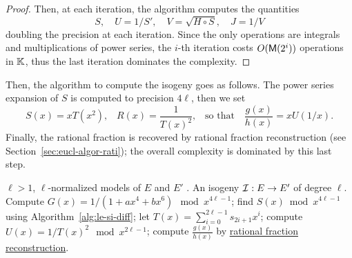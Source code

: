 \begin{proof}
  Then, at each iteration, the algorithm computes the quantities
  \begin{equation}
    \label{eq:174}
    S,\quad U = 1/S',\quad V = \sqrt{H\circ S},\quad J = 1/V
  \end{equation}
  doubling the precision at each iteration. Since the only operations
  are integrals and multiplications of power series, the $i$-th
  iteration costs $O(\mathsf{M}(2^i))$ operations in $\mathbb{K}$, thus the last
  iteration dominates the complexity.
\end{proof}


Then, the algorithm to compute the isogeny goes as follows.  The power
series expansion of $S$ is computed to precision $4\ell$, then we set
\begin{equation}
  \label{eq:180}
  S(x) = xT(x^2)
  \text{,}\quad
  R(x) = \frac{1}{T(x)^2}
  \text{,}\quad\text{so that}\quad
  \frac{g(x)}{h(x)} = xU(1/x)
  \text{.}
\end{equation}
Finally, the rational fraction is recovered by rational fraction
reconstruction (see Section~\ref{sec:eucl-algor-rati}); the overall
complexity is dominated by this last step.

\begin{algorithm}
  \caption{\label{alg:bmss}}
  \begin{algorithmic}[1]
    \REQUIRE $\ell>1$, $\ell$-normalized models of $E$ and $E'$ .
    \ENSURE An isogeny $\mathcal{I}:E\rightarrow E'$ of degree $\ell$.
    \STATE Compute $G(x) = 1/(1 + ax^4 + bx^6) \mod x^{4\ell-1}$;
    \STATE find $S(x)\bmod x^{4\ell-1}$ using Algorithm~\ref{alg:le-si-diff};
    \STATE let $T(x) = \sum_{i=0}^{2\ell-1}s_{2i+1}x^i$;
    \STATE compute $U(x) = 1/T(x)^2 \mod x^{2\ell-1}$;
    \STATE compute $\frac{g(x)}{h(x)}$ by \hyperref[sec:eucl-algor-rati]{rational fraction reconstruction}.
  \end{algorithmic}
\end{algorithm}

